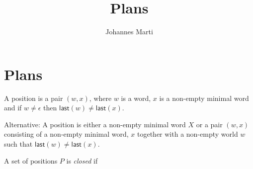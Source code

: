 \documentclass[a4paper]{article}
\title{Plans}
\author{Johannes Marti}
\newcommand{\last}[1]{\mathsf{last}({#1})}
\begin{document}
\maketitle

\section{Plans}

A position is a pair $(w,x)$, where $w$ is a word, $x$ is a non-empty
minimal word and if $w \neq \epsilon$ then $\last{w} \neq \last{x}$.

Alternative:
A position is either a non-empty minimal word $X$ or a pair $(w,x)$ consisting
of a non-empty minimal word, $x$ together with a non-empty world $w$
such that $\last{w} \neq \last{x}$.

A set of positions $P$ is \emph{closed} if
\begin{enumerate}

\end{enumerate}
\end{document}
